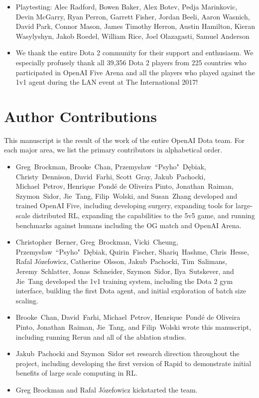 \documentclass[11pt]{article}
\newcommand{\cleanexpname}{Rerun\xspace}
\newcommand{\dota}{Dota 2\xspace}
\newcommand{\openaiarena}{OpenAI Five Arena\xspace}
\begin{document}
\begin{itemize}
\item Playtesting: 
Alec Radford, Bowen Baker, Alex Botev, %
Pedja Marinkovic, 
Devin McGarry, Ryan Perron, Garrett Fisher, Jordan Beeli, Aaron Wasnich,  David Park, Connor Mason, James Timothy Herron, Austin Hamilton, Kieran Wasylyshyn,
Jakob Roedel, William Rice, Joel Olazagasti, 
Samuel Anderson
\item We thank the entire \dota community for their support and enthusiasm. We especially profusely thank all 39,356 \dota players from 225 countries who participated in \openaiarena and all the players who played against the 1v1 agent during the LAN event at The International 2017!
\end{itemize}

\section*{Author Contributions}
This manuscript is the result of the work of the entire OpenAI Dota team. For each major area, we list the primary contributors in alphabetical order.
\begin{itemize}
    \item Greg~Brockman, Brooke~Chan, Przemys\l{}aw~``Psyho"~D\k{e}biak, Christy~Dennison, David~Farhi, Scott~Gray, Jakub~Pachocki, Michael~Petrov, Henrique~Pond\'e de Oliveira Pinto, Jonathan~Raiman, Szymon~Sidor, Jie~Tang, Filip~Wolski, and Susan~Zhang developed and trained OpenAI Five, including developing surgery, expanding tools for large-scale distributed RL, expanding the capabilities to the 5v5 game, and running benchmarks against humans including the OG match and OpenAI Arena.
    \item Christopher~Berner, Greg~Brockman, Vicki~Cheung, Przemys\l{}aw~``Psyho"~D\k{e}biak, Quirin~Fischer, Shariq~Hashme, Chris~Hesse, Rafal J\'{o}zefowicz, Catherine~Olsson, Jakub~Pachocki, Tim~Salimans, Jeremy~Schlatter, Jonas~Schneider, Szymon~Sidor, Ilya~Sutskever, and Jie~Tang developed the 1v1 training system, including the Dota 2 gym interface, building the first Dota agent, and initial exploration of batch size scaling.
    \item Brooke~Chan, David~Farhi, Michael~Petrov, Henrique~Pond\'e de Oliveira Pinto, Jonathan~Raiman, Jie~Tang, and Filip~Wolski wrote this manuscript, including running \cleanexpname and all of the ablation studies.
    \item Jakub~Pachocki and Szymon~Sidor set research direction throughout the project, including developing the first version of Rapid to demonstrate initial benefits of large scale computing in RL.
    \item Greg Brockman and Rafal J\'{o}zefowicz kickstarted the team. %
\end{itemize}
\end{document}
